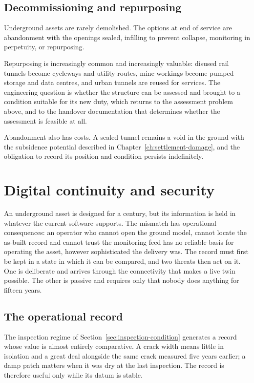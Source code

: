 \subsection{Decommissioning and repurposing}
\label{sec:decommissioning}

Underground assets are rarely demolished. The options at end of service are
abandonment with the openings sealed, infilling to prevent collapse, monitoring
in perpetuity, or repurposing.

Repurposing is increasingly common and increasingly valuable: disused rail
tunnels become cycleways and utility routes, mine workings become pumped
storage and data centres, and urban tunnels are reused for services. The
engineering question is whether the structure can be assessed and brought to a
condition suitable for its new duty, which returns to the assessment problem
above, and to the handover documentation that determines whether the
assessment is feasible at all.

Abandonment also has costs. A sealed tunnel remains a void in the ground with
the subsidence potential described in
Chapter~\ref{ch:settlement-damage}, and the obligation to record its position
and condition persists indefinitely.

\section{Digital continuity and security}
\label{sec:digital-continuity}

An underground asset is designed for a century, but its information is held in
whatever the current software supports. The mismatch has operational
consequences: an operator who cannot open the ground model, cannot
locate the as-built record and cannot trust the monitoring feed has no
reliable basis for operating the asset, however sophisticated the delivery was. The record
must first be kept in a state in which it can be compared, and two threats then
act on it. One is deliberate and arrives through the connectivity that
makes a live twin possible. The other is passive and requires only
that nobody does anything for fifteen years.

\subsection{The operational record}
\label{sec:operational-record}

The inspection regime of Section~\ref{sec:inspection-condition} generates a
record whose value is almost entirely comparative. A crack width means little
in isolation and a great deal alongside the same crack measured five years
earlier; a damp patch matters when it was dry at the last inspection. The
record is therefore useful only while its datum is stable.

